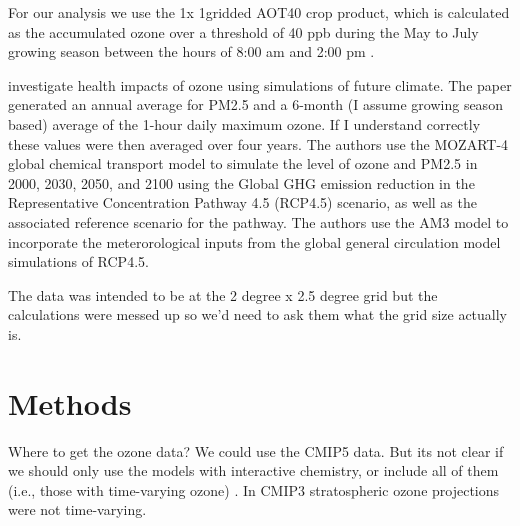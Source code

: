 \documentclass[10pt]{amsart}
\begin{document}
For our analysis we use the 1\degree x 1\degree gridded AOT40 crop product, which is calculated as the accumulated ozone over a threshold of 40 ppb during the May to July growing season between the hours of 8:00 am and 2:00 pm \parencite{sofen:2016aa}.

\cite{} investigate health impacts of ozone using simulations of future climate. 
The \cite{j:2013aa} paper generated an annual average for PM2.5 and a 6-month (I assume growing season based) average of the 1-hour daily maximum ozone. 
If I understand correctly these values were then averaged over four years. 
The authors use the MOZART-4 global chemical transport model to simulate the level of ozone and PM2.5 in 2000, 2030, 2050, and 2100 using the Global GHG emission reduction in the Representative Concentration Pathway 4.5 (RCP4.5) scenario, as well as the associated reference scenario for the pathway.
The authors use the AM3 model to incorporate the meterorological inputs from the global general circulation model simulations of RCP4.5.  



The data was intended to be at the 2 degree x 2.5 degree grid but the calculations were messed up so we'd need to ask them what the grid size actually is. 


\section{Methods}
Where to get the ozone data?
We could use the CMIP5 data.
But its not clear if we should only use the models with interactive chemistry, or include all of them (i.e., those with time-varying ozone) \parencite{eyring2013long}.
In CMIP3 stratospheric ozone projections were not time-varying. 

\printbibliography
\end{document}
